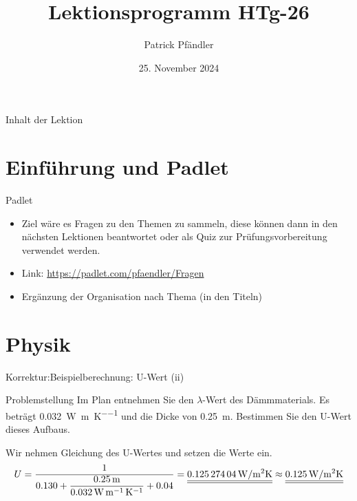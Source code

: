 



\title{\textbf{Lektionsprogramm HTg-26}}
\author{Patrick Pfändler}
\date{25. November 2024}




\frame{\titlepage}

\begin{frame}{Inhalt der Lektion}
    \tableofcontents
\end{frame}


\section{Einführung und Padlet}

\begin{frame}{Padlet}
\begin{itemize}
	\item[\textbullet] Ziel wäre es Fragen zu den Themen zu sammeln, diese können dann in den nächsten Lektionen beantwortet oder als Quiz zur Prüfungsvorbereitung verwendet werden.
	\item[\textbullet] Link: \url{https://padlet.com/pfaendler/Fragen}
	\item[\textbullet] Ergänzung der Organisation nach Thema (in den Titeln)
\end{itemize}
\end{frame}

\section{Physik}

\begin{frame}{Korrektur:Beispielberechnung: U-Wert (ii)}
    \newcommand{\UWertZiel}{0.25}
    \newcommand{\mydicke}{27}
    \newcommand{\myLambda}{0.032} %
    
    \begin{block}{Problemstellung}
    Im Plan entnehmen Sie den $\lambda$-Wert des Dämmmaterials. Es beträgt {\SI{\myLambda}{\W\per\m\per\K}} und die Dicke von \SI{0.25}{\m}.
    Bestimmen Sie den U-Wert dieses Aufbaus.
    \end{block}
    \begin{myLösung}
    Wir nehmen Gleichung des U-Wertes und setzen die Werte ein.
    \begin{equation*}
        U = \dfrac{1}{0.130 + \dfrac{\SI{0.25}{\m}}{\SI{\myLambda}{\W\per\m\per\K}} + 0.04}
        = \FinRes{\SI{0.12527404
    }{\W\per\m^2\K}} \approx \FinRes{\SI{0.125}{\W\per\m^2\K}}
    \end{equation*}
    \end{myLösung}
    \end{frame}


